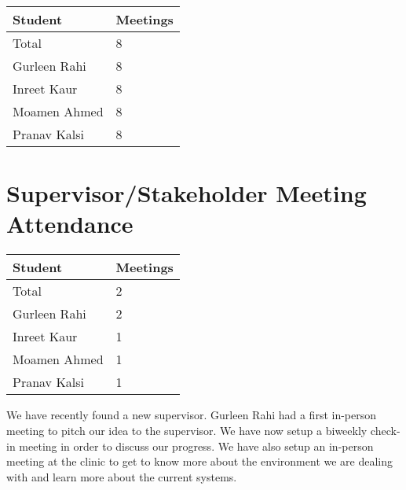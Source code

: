 \documentclass{article}
\begin{document}
\begin{table}[H]
\centering
\begin{tabular}{ll}
\toprule
\textbf{Student} & \textbf{Meetings}\\
\midrule
Total & 8\\
Gurleen Rahi & 8 \\
Inreet Kaur & 8 \\
Moamen Ahmed & 8 \\
Pranav Kalsi & 8 \\
\bottomrule
\end{tabular}
\end{table}


\section{Supervisor/Stakeholder Meeting Attendance}


\begin{table}[H]
\centering
\begin{tabular}{ll}
\toprule
\textbf{Student} & \textbf{Meetings}\\
\midrule
Total & 2 \\
Gurleen Rahi & 2\\
Inreet Kaur & 1\\
Moamen Ahmed & 1\\
Pranav Kalsi & 1\\
\bottomrule
\end{tabular}
\end{table}

We have recently found a new supervisor. Gurleen Rahi had a first in-person meeting to pitch our idea to the supervisor. We have now setup a biweekly check-in meeting in order to discuss our progress. We have also setup an in-person meeting at the clinic to get to know more about the environment we are dealing with and learn more about the current systems. 
\end{document}
